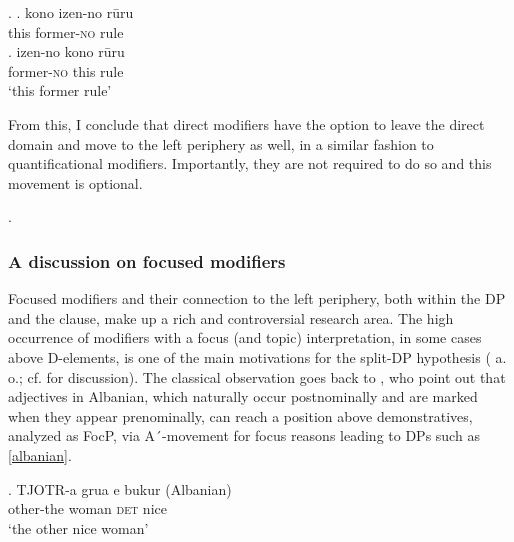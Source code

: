 \documentclass [output=book,colorlinks,citecolor=brown]{langscibook}
\begin{document}
\ex. \ag. kono izen-no rūru\\
this former-\textsc{no} rule\\
\bg. izen-no kono rūru\\
former-\textsc{no} this rule\\
`this former rule’

From this, I conclude that direct modifiers have the option to leave the direct domain and move to the left periphery as well, in a similar fashion to quantificational modifiers. Importantly, they are not required to do so and this movement is optional.

\newpage

\ex. 

\subsubsection{A discussion on focused modifiers} \label{focus,japanese}

Focused modifiers and their connection to the left periphery, both within the DP and the clause, make up a rich and controversial research area. The high occurrence of modifiers with a focus (and topic) interpretation, in some cases above D-elements, is one of the main motivations for the split-DP hypothesis (\citealt{kiss:1998:identificational, kiss:2007:topic, giusti:1996:is, dimitrova:1998:fragments, ihsane:2001:specific, laenzlinger:2005:french, kim:2019:syntax} a. o.; cf. \citealt[140–151]{alex:2007:nounphrase} for discussion). The classical observation goes back to \citet{giusti:1996:is, dimitrova:1998:fragments}, who point out that adjectives in Albanian, which naturally occur postnominally and are marked when they appear prenominally, can reach a position above demonstratives, analyzed as FocP, via A´-movement for focus reasons leading to DPs such as \ref{albanian}. %

\exg. TJOTR-a grua e bukur (Albanian)\\
other-the woman \textsc{det} nice\\
`the other nice woman' \\ \null \hfill \citep[113]{giusti:1996:is} \label{albanian}
\end{document}
